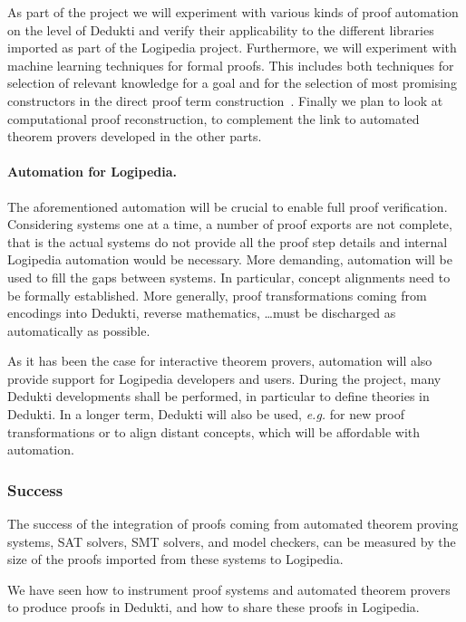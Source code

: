 As part of the project we will experiment with various kinds of proof
automation on the level of Dedukti and verify their applicability to
the different libraries imported as part of the Logipedia project.
Furthermore, we will experiment with machine learning techniques for
formal proofs. This includes both techniques for selection of relevant
knowledge for a goal and for the selection of most promising
constructors in the direct proof term
construction~\cite{ZielenkiewiczSchubert2016}. Finally we plan to look
at computational proof reconstruction, to complement the link to
automated theorem provers developed in the other parts.

\paragraph*{Automation for Logipedia.}
The aforementioned automation will be crucial to enable full proof
verification. Considering systems one at a time, a number of proof
exports are not complete, that is the actual systems do not provide
all the proof step details and internal Logipedia automation would be
necessary. More demanding, automation will be used to fill the gaps
between systems. In particular, concept alignments need to be formally
established. More generally, proof transformations coming from
encodings into Dedukti, reverse mathematics, \dots must be discharged
as automatically as possible.

As it has been the case for interactive theorem provers, automation
will also provide support for Logipedia developers and users. During
the project, many Dedukti developments shall be performed, in
particular to define theories in Dedukti. In a longer term, Dedukti
will also be used, {\em e.g.} for new proof transformations or to
align distant concepts, which will be affordable with automation.

\subsubsection*{Success}

The success of the integration of proofs coming from automated theorem
proving systems, SAT solvers, SMT solvers, and model checkers, can be
measured by the size of the proofs imported from these systems to Logipedia.


We have seen how to instrument proof systems and automated theorem
provers to produce proofs in Dedukti, and how to share these proofs in
Logipedia.


